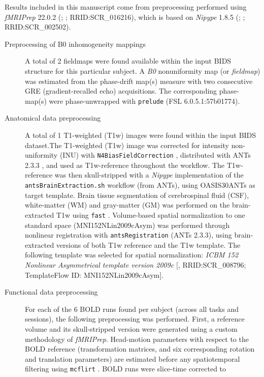 \documentclass[
]{article}
\author{}
\date{}
\begin{document}
Results included in this manuscript come from preprocessing performed
using \emph{fMRIPrep} 22.0.2 (\citet{fmriprep1}; \citet{fmriprep2};
RRID:SCR\_016216), which is based on \emph{Nipype} 1.8.5
(\citet{nipype1}; \citet{nipype2}; RRID:SCR\_002502).

\begin{description}
\item[Preprocessing of B0 inhomogeneity mappings]
A total of 2 fieldmaps were found available within the input BIDS
structure for this particular subject. A \emph{B0} nonuniformity map (or
\emph{fieldmap}) was estimated from the phase-drift map(s) measure with
two consecutive GRE (gradient-recalled echo) acquisitions. The
corresponding phase-map(s) were phase-unwrapped with \texttt{prelude}
(FSL 6.0.5.1:57b01774).
\item[Anatomical data preprocessing]
A total of 1 T1-weighted (T1w) images were found within the input BIDS
dataset.The T1-weighted (T1w) image was corrected for intensity
non-uniformity (INU) with \texttt{N4BiasFieldCorrection} \citep{n4},
distributed with ANTs 2.3.3 \citep[RRID:SCR\_004757]{ants}, and used as
T1w-reference throughout the workflow. The T1w-reference was then
skull-stripped with a \emph{Nipype} implementation of the
\texttt{antsBrainExtraction.sh} workflow (from ANTs), using OASIS30ANTs
as target template. Brain tissue segmentation of cerebrospinal fluid
(CSF), white-matter (WM) and gray-matter (GM) was performed on the
brain-extracted T1w using \texttt{fast} \citep[FSL 6.0.5.1:57b01774,
RRID:SCR\_002823,][]{fsl_fast}. Volume-based spatial normalization to
one standard space (MNI152NLin2009cAsym) was performed through nonlinear
registration with \texttt{antsRegistration} (ANTs 2.3.3), using
brain-extracted versions of both T1w reference and the T1w template. The
following template was selected for spatial normalization: \emph{ICBM
152 Nonlinear Asymmetrical template version 2009c}
{[}\citet{mni152nlin2009casym}, RRID:SCR\_008796; TemplateFlow ID:
MNI152NLin2009cAsym{]}.
\item[Functional data preprocessing]
For each of the 6 BOLD runs found per subject (across all tasks and
sessions), the following preprocessing was performed. First, a reference
volume and its skull-stripped version were generated using a custom
methodology of \emph{fMRIPrep}. Head-motion parameters with respect to
the BOLD reference (transformation matrices, and six corresponding
rotation and translation parameters) are estimated before any
spatiotemporal filtering using \texttt{mcflirt} \citep[FSL
6.0.5.1:57b01774,][]{mcflirt}. BOLD runs were slice-time corrected to

\end{description}
\end{document}
